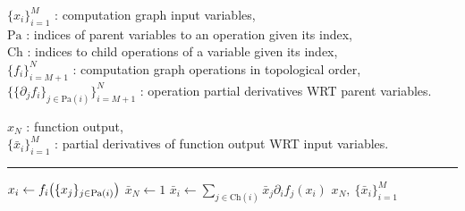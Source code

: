 \begin{algorithmic}
\small
    \Require
    $\lbrace x_i \rbrace_{i=1}^M$ : computation graph input variables,\\
    $\textrm{Pa}$ : indices of parent variables to an operation given its index,\\
    $\textrm{Ch}$ : indices to child operations of a variable given its index,\\
    $\lbrace f_i \rbrace_{i=M+1}^N$ : computation graph operations in topological order,\\%
    $\big\lbrace \lbrace \partial_j f_i\rbrace_{j \in \textrm{Pa}(i)}\big\rbrace_{i=M+1}^N$ : operation partial derivatives \acs{WRT} parent variables.\vspace{0.5mm}
    \Ensure\raggedright
    $x_{N}$ : function output,\\
    $\lbrace \bar{x}_i \rbrace_{i=1}^{M}$ : partial derivatives of function output \acs{WRT} input variables.
\end{algorithmic}
\hrule
\small
\begin{algorithmic}[1]
   
    \vspace{0.5mm}
    \State $x_i \gets f_i\lpa \lbrace x_j \rbrace_{j \in \textrm{Pa}(i)}\rpa$
  \EndFor
  \State $\bar{x}_N \gets 1$  
    \State $\bar{x}_i \gets \sum_{j \in \textrm{Ch}(i)} \bar{x}_j \partial_i{f_j}(x_i)$
  \EndFor
  \State \Return $x_N,~ \lbrace \bar{x}_i \rbrace_{i=1}^{M}$
\end{algorithmic}
